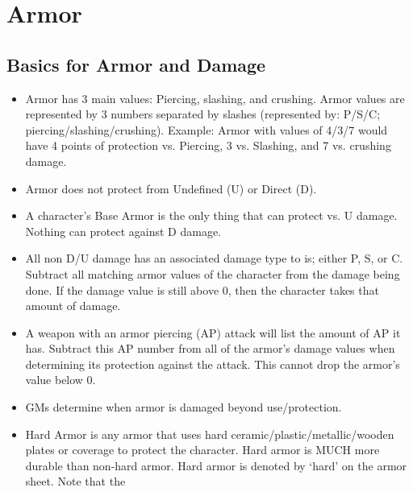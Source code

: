 \documentclass[twoside]{book}
\begin{document}
    

\section{Armor}
    
    

\subsection{Basics for Armor and Damage}
    
\begin{itemize}
      
  \item   Armor has 3 main values: Piercing, slashing, and
                 crushing. Armor values are represented by 3 numbers
                 separated by slashes (represented by: P/S/C;
                 piercing/slashing/crushing). Example: Armor with values
                 of 4/3/7 would have 4 points of protection vs. Piercing,
                 3 vs. Slashing, and 7 vs. crushing damage. 
  \item   Armor does not protect from Undefined (U) or
                 Direct (D). 
  \item   A character's Base Armor is the only thing
                 that can protect vs. U damage. Nothing can protect
                 against D damage. 
  \item   All non D/U damage has an associated damage type
                 to is; either P, S, or C. Subtract all matching armor
                 values of the character from the damage being done. If
                 the damage value is still above 0, then the character
                 takes that amount of damage. 
  \item   A weapon with an armor piercing (AP) attack will
                 list the amount of AP it has. Subtract this AP number
                 from all of the armor's damage values when
                 determining its protection against the attack. This
                 cannot drop the armor's value below 0. 
  \item   GMs determine when armor is damaged beyond
                 use/protection. 
  \item   Hard Armor is any armor that uses hard
                 ceramic/plastic/metallic/wooden plates or coverage to
                 protect the character. Hard armor is MUCH more durable
                 than non-hard armor. Hard armor is denoted by
                 `hard' on the armor sheet. Note that the

\end{itemize}
\end{document}
